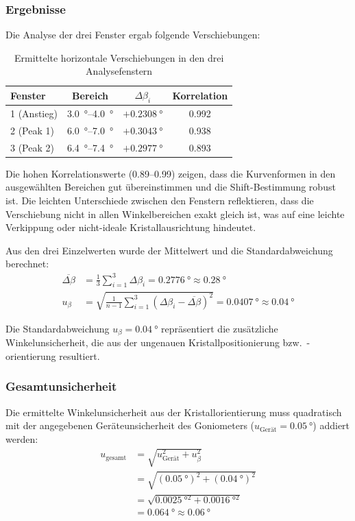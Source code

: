 \subsubsection{Ergebnisse}

Die Analyse der drei Fenster ergab folgende Verschiebungen:

\begin{table}[h]
\centering
\caption{Ermittelte horizontale Verschiebungen in den drei Analysefenstern}
\label{tab:shifts}
\begin{tabular}{lccc}
\toprule
Fenster & Bereich & $\Delta\beta_i$ & Korrelation \\
\midrule
1 (Anstieg)    & \SIrange{3.0}{4.0}{\degree}   & $+\SI{0.2308}{\degree}$ & 0.992 \\
2 (Peak 1)     & \SIrange{6.0}{7.0}{\degree}   & $+\SI{0.3043}{\degree}$ & 0.938 \\
3 (Peak 2)     & \SIrange{6.4}{7.4}{\degree}   & $+\SI{0.2977}{\degree}$ & 0.893 \\
\bottomrule
\end{tabular}
\end{table}

Die hohen Korrelationswerte (0.89--0.99) zeigen, dass die Kurvenformen in den ausgewählten Bereichen gut übereinstimmen und die Shift-Bestimmung robust ist. Die leichten Unterschiede zwischen den Fenstern reflektieren, dass die Verschiebung nicht in allen Winkelbereichen exakt gleich ist, was auf eine leichte Verkippung oder nicht-ideale Kristallausrichtung hindeutet.

Aus den drei Einzelwerten wurde der Mittelwert und die Standardabweichung berechnet:
\begin{align}
\overline{\Delta\beta} &= \frac{1}{3}\sum_{i=1}^{3} \Delta\beta_i = \SI{+0.2776}{\degree} \approx \SI{+0.28}{\degree} \\
u_\beta &= \sqrt{\frac{1}{n-1}\sum_{i=1}^{3}(\Delta\beta_i - \overline{\Delta\beta})^2} = \SI{0.0407}{\degree} \approx \SI{0.04}{\degree}
\end{align}

Die Standardabweichung $u_\beta = \SI{0.04}{\degree}$ repräsentiert die zusätzliche Winkelunsicherheit, die aus der ungenauen Kristallpositionierung bzw.\ -orientierung resultiert.

\subsubsection{Gesamtunsicherheit}

Die ermittelte Winkelunsicherheit aus der Kristallorientierung muss quadratisch mit der angegebenen Geräteunsicherheit des Goniometers ($u_{\text{Gerät}} = \SI{0.05}{\degree}$) addiert werden:
\begin{align}
u_{\text{gesamt}} &= \sqrt{u_{\text{Gerät}}^2 + u_\beta^2} \\
                   &= \sqrt{(\SI{0.05}{\degree})^2 + (\SI{0.04}{\degree})^2} \\
                   &= \sqrt{\SI{0.0025}{\degree^2} + \SI{0.0016}{\degree^2}} \\
                   &= \SI{0.064}{\degree} \approx \SI{0.06}{\degree}
\end{align}

